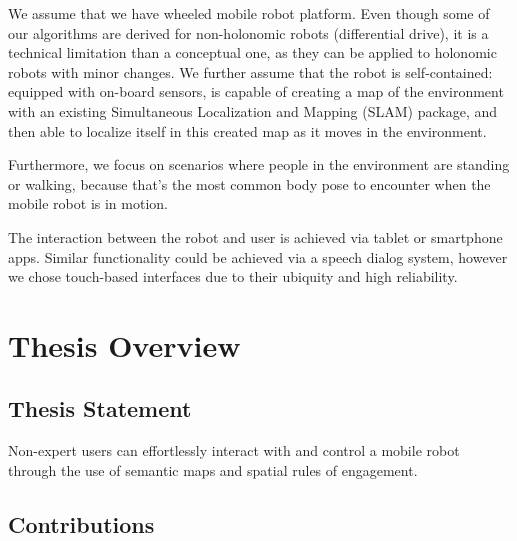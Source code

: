 \documentclass[12pt]{gatech-thesis}
\begin{document}
We assume that we have wheeled mobile robot platform. Even though some of our algorithms are derived for non-holonomic robots (differential drive), it is a technical limitation than a conceptual one, as they can be applied to holonomic robots with minor changes. We further assume that the robot is self-contained: equipped with on-board sensors, is capable of creating a map of the environment with an existing Simultaneous Localization and Mapping (SLAM) package, and then able to localize itself in this created map as it moves in the environment.

Furthermore, we focus on scenarios where people in the environment are standing or walking, because that's the most common body pose to encounter when the mobile robot is in motion.

The interaction between the robot and user is achieved via tablet or smartphone apps. Similar functionality could be achieved via a speech dialog system, however we chose touch-based interfaces due to their ubiquity and high reliability.

\section{Thesis Overview}
\subsection{Thesis Statement}


Non-expert users can effortlessly interact with and control a mobile robot through the use of semantic maps and spatial rules of engagement.

\subsection{Contributions}
\end{document}
